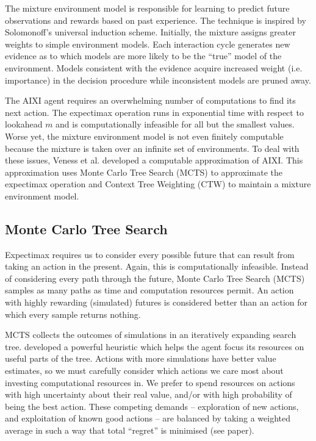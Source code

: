 \documentclass{article}
\theoremstyle{definition}
\newtheorem{primary statistics}[definition]{Primary Statistics}
\newtheorem{auxiliary statistics}[definition]{Auxiliary Statistics}
\begin{document}
The mixture environment model is responsible for learning to predict future observations and rewards based on past experience. The technique is inspired by Solomonoff’s universal induction scheme. Initially, the mixture assigns greater weights to simple environment models. Each interaction cycle generates new evidence as to which models are more likely to be the “true” model of the environment. Models consistent with the evidence acquire increased weight (i.e. importance) in the decision procedure while inconsistent models are pruned away.

The AIXI agent requires an overwhelming number of computations to find its next action. The expectimax operation runs in exponential time with respect to lookahead $m$ and is computationally infeasible for all but the smallest values. Worse yet, the mixture environment model is not even finitely computable because the mixture is taken over an infinite set of environments. To deal with these issues, Veness et al. developed a computable approximation of AIXI. This approximation uses Monte Carlo Tree Search (MCTS) to approximate the expectimax operation and Context Tree Weighting (CTW) to maintain a mixture environment model. 

\subsection{Monte Carlo Tree Search}
Expectimax requires us to consider every possible future that can result from taking an action in the present. Again, this is computationally infeasible. Instead of considering every path through the future, Monte Carlo Tree Search (MCTS) samples as many paths as time and computation resources permit. An action with highly rewarding (simulated) futures is considered better than an action for which every sample returns nothing.

MCTS collects the outcomes of simulations in an iteratively expanding search tree.  \citep{kocsis2006bandit} developed a powerful heuristic which helps the agent focus its resources on useful parts of the tree. Actions with more simulations have better value estimates, so we must carefully consider which actions we care most about investing computational resources in. We prefer to spend resources on actions with high uncertainty about their real value, and/or with high probability of being the best action. These competing demands -- exploration of new actions, and exploitation of known good actions -- are balanced by taking a weighted average in such a way that total “regret” is minimised (see paper).
\end{document}
